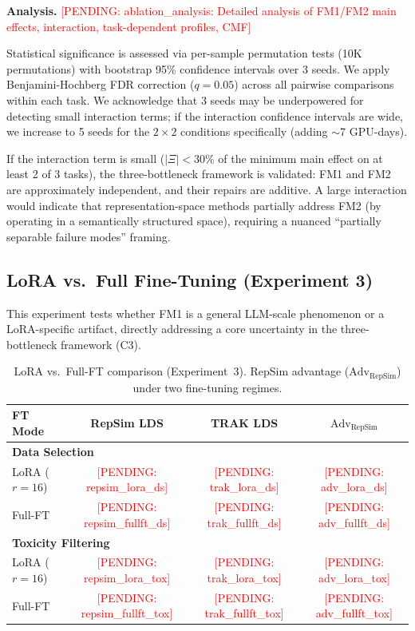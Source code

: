 \documentclass{article}
\newcommand{\pending}[1]{\textcolor{red}{[PENDING: #1]}}
\begin{document}
\textbf{Analysis.} \pending{ablation\_analysis: Detailed analysis of FM1/FM2 main effects, interaction, task-dependent profiles, CMF}

Statistical significance is assessed via per-sample permutation tests (10K permutations) with bootstrap 95\% confidence intervals over 3 seeds. We apply Benjamini-Hochberg FDR correction ($q = 0.05$) across all pairwise comparisons within each task. We acknowledge that 3 seeds may be underpowered for detecting small interaction terms; if the interaction confidence intervals are wide, we increase to 5 seeds for the $2 \times 2$ conditions specifically (adding $\sim$7 GPU-days).

If the interaction term is small ($|\Xi| < 30\%$ of the minimum main effect on at least 2 of 3 tasks), the three-bottleneck framework is validated: FM1 and FM2 are approximately independent, and their repairs are additive. A large interaction would indicate that representation-space methods partially address FM2 (by operating in a semantically structured space), requiring a nuanced ``partially separable failure modes'' framing.

\subsection{LoRA vs.\ Full Fine-Tuning (Experiment 3)}
\label{sec:lora_ft}

This experiment tests whether FM1 is a general LLM-scale phenomenon or a LoRA-specific artifact, directly addressing a core uncertainty in the three-bottleneck framework (C3).

\begin{table}[t]
    \centering
    \caption{LoRA vs.\ Full-FT comparison (Experiment~3). RepSim advantage ($\text{Adv}_\text{RepSim}$) under two fine-tuning regimes.}
    \label{tab:lora_ft}
    \small
    \begin{tabular}{lccc}
        \toprule
        FT Mode & RepSim LDS & TRAK LDS & $\text{Adv}_\text{RepSim}$ \\
        \midrule
        \multicolumn{4}{l}{\textbf{Data Selection}} \\
        LoRA ($r = 16$) & \pending{repsim\_lora\_ds} & \pending{trak\_lora\_ds} & \pending{adv\_lora\_ds} \\
        Full-FT & \pending{repsim\_fullft\_ds} & \pending{trak\_fullft\_ds} & \pending{adv\_fullft\_ds} \\
        \midrule
        \multicolumn{4}{l}{\textbf{Toxicity Filtering}} \\
        LoRA ($r = 16$) & \pending{repsim\_lora\_tox} & \pending{trak\_lora\_tox} & \pending{adv\_lora\_tox} \\
        Full-FT & \pending{repsim\_fullft\_tox} & \pending{trak\_fullft\_tox} & \pending{adv\_fullft\_tox} \\
        \bottomrule
    \end{tabular}
\end{table}
\end{document}
